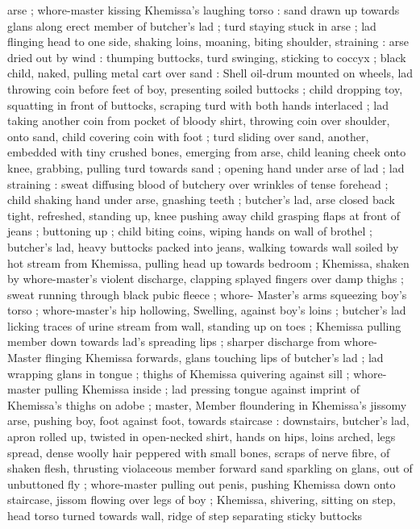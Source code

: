 arse ; whore-master kissing Khemissa's laughing torso : sand drawn 
up towards glans along erect member of butcher's lad ; turd staying 
stuck in arse ; lad flinging head to one side, shaking loins, moaning, 
biting shoulder, straining : arse dried out by wind : thumping 
buttocks, turd swinging, sticking to coccyx ; black child, naked, 
pulling metal cart over sand : Shell oil-drum mounted on wheels, lad 
throwing coin before feet of boy, presenting soiled buttocks ; child 
dropping toy, squatting in front of buttocks, scraping turd with both 
hands interlaced ; lad taking another coin from pocket of bloody 
shirt, throwing coin over shoulder, onto sand, child covering coin with 
foot ; turd sliding over sand, another, embedded with tiny crushed 
bones, emerging from arse, child leaning cheek onto knee, grabbing, 
pulling turd towards sand ; opening hand under arse of lad ; lad 
straining : sweat diffusing blood of butchery over wrinkles of tense 
forehead ; child shaking hand under arse, gnashing teeth ; butcher's 
lad, arse closed back tight, refreshed, standing up, knee pushing 
away child grasping flaps at front of jeans ; buttoning up ; child 
biting coins, wiping hands on wall of brothel ; butcher's lad, heavy 
buttocks packed into jeans, walking towards wall soiled by hot stream 
from Khemissa, pulling head up towards bedroom ; Khemissa, shaken 
by whore-master's violent discharge, clapping splayed fingers over 
damp thighs ; sweat running through black pubic fleece ; whore- 
Master's arms squeezing boy's torso ; whore-master's hip hollowing, 
Swelling, against boy's loins ; butcher's lad licking traces of urine 
stream from wall, standing up on toes ; Khemissa pulling member 
down towards lad's spreading lips ; sharper discharge from whore- 
Master flinging Khemissa forwards, glans touching lips of butcher's 
lad ; lad wrapping glans in tongue ; thighs of Khemissa quivering 
against sill ; whore-master pulling Khemissa inside ; lad pressing 
tongue against imprint of Khemissa's thighs on adobe ; master, 
Member floundering in Khemissa's jissomy arse, pushing boy, foot 
against foot, towards staircase : downstairs, butcher's lad, apron 
rolled up, twisted in open-necked shirt, hands on hips, loins arched, 
legs spread, dense woolly hair peppered with small bones, scraps of 
nerve fibre, of shaken flesh, thrusting violaceous member forward 
sand sparkling on glans, out of unbuttoned fly ; whore-master 
pulling out penis, pushing Khemissa down onto staircase, jissom 
flowing over legs of boy ; Khemissa, shivering, sitting on step, head 
torso turned towards wall, ridge of step separating sticky buttocks 
